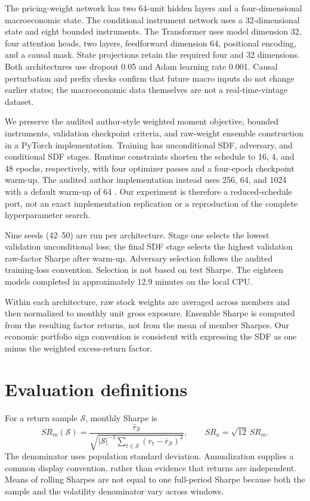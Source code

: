 \documentclass[11pt]{article}
\begin{document}
The pricing-weight network has two 64-unit hidden layers and a four-dimensional macroeconomic state. The conditional instrument network uses a 32-dimensional state and eight bounded instruments. The Transformer uses model dimension 32, four attention heads, two layers, feedforward dimension 64, positional encoding, and a causal mask. State projections retain the required four and 32 dimensions. Both architectures use dropout 0.05 and Adam learning rate 0.001. Causal perturbation and prefix checks confirm that future macro inputs do not change earlier states; the macroeconomic data themselves are not a real-time-vintage dataset.

We preserve the audited author-style weighted moment objective, bounded instruments, validation checkpoint criteria, and raw-weight ensemble construction in a PyTorch implementation. Training has unconditional SDF, adversary, and conditional SDF stages. Runtime constraints shorten the schedule to 16, 4, and 48 epochs, respectively, with four optimizer passes and a four-epoch checkpoint warm-up. The audited author implementation instead uses 256, 64, and 1024 with a default warm-up of 64 \cite{code}. Our experiment is therefore a reduced-schedule port, not an exact implementation replication or a reproduction of the complete hyperparameter search.

Nine seeds (42--50) are run per architecture. Stage one selects the lowest validation unconditional loss; the final SDF stage selects the highest validation raw-factor Sharpe after warm-up. Adversary selection follows the audited training-loss convention. Selection is not based on test Sharpe. The eighteen models completed in approximately 12.9 minutes on the local CPU.

Within each architecture, raw stock weights are averaged across members and then normalized to monthly unit gross exposure. Ensemble Sharpe is computed from the resulting factor returns, not from the mean of member Sharpes. Our economic portfolio sign convention is consistent with expressing the SDF as one minus the weighted excess-return factor.
\section{Evaluation definitions}
For a return sample $\mathcal S$, monthly Sharpe is
\[
 SR_m(\mathcal S)=\frac{\bar r_{\mathcal S}}{\sqrt{|\mathcal S|^{-1}\sum_{t\in\mathcal S}(r_t-\bar r_{\mathcal S})^2}},\qquad SR_a=\sqrt{12}\,SR_m.
\]
The denominator uses population standard deviation. Annualization supplies a common display convention, rather than evidence that returns are independent. Means of rolling Sharpes are not equal to one full-period Sharpe because both the sample and the volatility denominator vary across windows.
\end{document}
